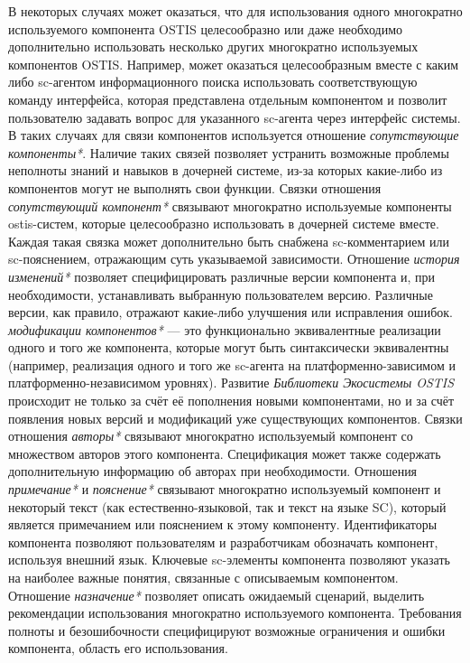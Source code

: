 В некоторых случаях может оказаться, что для использования одного многократно используемого компонента OSTIS целесообразно или даже необходимо дополнительно использовать несколько других многократно используемых компонентов OSTIS. Например, может оказаться целесообразным вместе с каким либо sc-агентом информационного поиска использовать соответствующую команду интерфейса, которая представлена отдельным компонентом и позволит пользователю задавать вопрос для указанного sc-агента через интерфейс системы. В таких случаях для связи компонентов используется отношение \textit{сопутствующие компоненты*}. Наличие таких связей позволяет устранить возможные проблемы неполноты знаний и навыков в дочерней системе, из-за которых какие-либо из компонентов могут не выполнять свои функции. Связки отношения \textit{сопутствующий компонент*} связывают многократно используемые компоненты ostis-систем, которые целесообразно использовать в дочерней системе вместе. Каждая такая связка может дополнительно быть снабжена sc-комментарием или sc-пояснением, отражающим суть указываемой зависимости. Отношение \textit{история изменений*} позволяет специфицировать различные версии компонента и, при необходимости, устанавливать выбранную пользователем версию. Различные версии, как правило, отражают какие-либо улучшения или исправления ошибок. \textit{модификации компонентов*} --- это функционально эквивалентные реализации одного и того же компонента, которые могут быть синтаксически эквивалентны (например, реализация одного и того же sc-агента на платформенно-зависимом и платформенно-независимом уровнях). Развитие \textit{Библиотеки Экосистемы OSTIS} происходит не только за счёт её пополнения новыми компонентами, но и за счёт появления новых версий и модификаций уже существующих компонентов. Связки отношения \textit{авторы*} связывают многократно используемый компонент со множеством авторов этого компонента. Спецификация может также содержать дополнительную информацию об авторах при необходимости. Отношения \textit{примечание*} и \textit{пояснение*} связывают многократно используемый компонент и некоторый текст (как естественно-языковой, так и текст на языке SC), который является примечанием или пояснением к этому компоненту. Идентификаторы компонента позволяют пользователям и разработчикам обозначать компонент, используя внешний язык. Ключевые sc-элементы компонента позволяют указать на наиболее важные понятия, связанные с описываемым компонентом. Отношение \textit{назначение*} позволяет описать ожидаемый сценарий, выделить рекомендации использования многократно используемого компонента. Требования полноты и безошибочности специфицируют возможные ограничения и ошибки компонента, область его использования.

